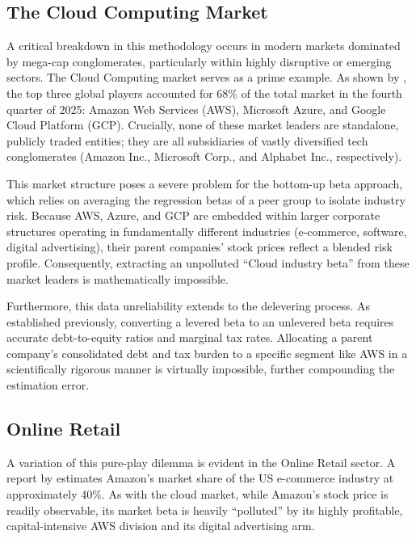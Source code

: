 \subsection*{The Cloud Computing Market}

A critical breakdown in this methodology occurs in modern markets dominated by mega-cap conglomerates, particularly within highly disruptive or emerging sectors. The Cloud Computing market serves as a prime example. As shown by \textcite{SynergyCloud2025Q4}, the top three global players accounted for 68\% of the total market in the fourth quarter of 2025: Amazon Web Services (AWS), Microsoft Azure, and Google Cloud Platform (GCP). Crucially, none of these market leaders are standalone, publicly traded entities; they are all subsidiaries of vastly diversified tech conglomerates (Amazon Inc., Microsoft Corp., and Alphabet Inc., respectively).

This market structure poses a severe problem for the bottom-up beta approach, which relies on averaging the regression betas of a peer group to isolate industry risk. Because AWS, Azure, and GCP are embedded within larger corporate structures operating in fundamentally different industries (e-commerce, software, digital advertising), their parent companies' stock prices reflect a blended risk profile. Consequently, extracting an unpolluted ``Cloud industry beta'' from these market leaders is mathematically impossible.

Furthermore, this data unreliability extends to the delevering process. As established previously, converting a levered beta to an unlevered beta requires accurate debt-to-equity ratios and marginal tax rates. Allocating a parent company's consolidated debt and tax burden to a specific segment like AWS in a scientifically rigorous manner is virtually impossible, further compounding the estimation error.

\subsection*{Online Retail}

A variation of this pure-play dilemma is evident in the Online Retail sector. A report by \textcite{EMARKETER2025AmazonShare} estimates Amazon's market share of the US e-commerce industry at approximately 40\%. As with the cloud market, while Amazon's stock price is readily observable, its market beta is heavily ``polluted'' by its highly profitable, capital-intensive AWS division and its digital advertising arm.

